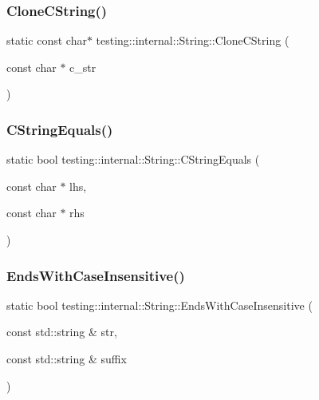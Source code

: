 \subsubsection{\texorpdfstring{CloneCString()}{CloneCString()}}
{\footnotesize\ttfamily static const char$\ast$ testing\+::internal\+::\+String\+::\+Clone\+C\+String (\begin{DoxyParamCaption}\item[{const char $\ast$}]{c\+\_\+str }\end{DoxyParamCaption})\hspace{0.3cm}{\ttfamily [static]}}

\mbox{\label{classtesting_1_1internal_1_1_string_a06919f642bd47f0593196b460d352f24}} 
\subsubsection{\texorpdfstring{CStringEquals()}{CStringEquals()}}
{\footnotesize\ttfamily static bool testing\+::internal\+::\+String\+::\+C\+String\+Equals (\begin{DoxyParamCaption}\item[{const char $\ast$}]{lhs,  }\item[{const char $\ast$}]{rhs }\end{DoxyParamCaption})\hspace{0.3cm}{\ttfamily [static]}}

\mbox{\label{classtesting_1_1internal_1_1_string_a3de1df085eddc89ef3f3833c67aee3fe}} 
\subsubsection{\texorpdfstring{EndsWithCaseInsensitive()}{EndsWithCaseInsensitive()}}
{\footnotesize\ttfamily static bool testing\+::internal\+::\+String\+::\+Ends\+With\+Case\+Insensitive (\begin{DoxyParamCaption}\item[{const std\+::string \&}]{str,  }\item[{const std\+::string \&}]{suffix }\end{DoxyParamCaption})\hspace{0.3cm}{\ttfamily [static]}}

